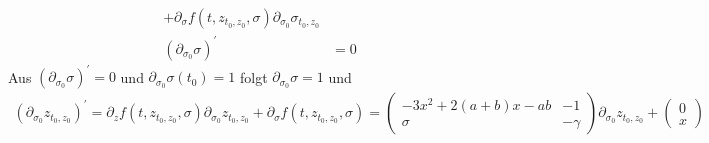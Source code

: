 \begin{solution}
\begin{enumerate}[label = \textbf{\alph*)}]
\begin{align*}
  + \partial_{\sigma} f(t,z_{t_0,z_0},\sigma) \partial_{\sigma_0} \sigma_{t_0,z_0} \\
  (\partial_{\sigma_0} \sigma)^{\prime} &= 0
\end{align*}
Aus $(\partial_{\sigma_0} \sigma)^{\prime} = 0$ und $\partial_{\sigma_0}\sigma(t_0) = 1$
folgt $\partial_{\sigma_0} \sigma = 1$ und
\begin{align*}
  (\partial_{\sigma_0}z_{t_0,z_0})^{\prime} =
  \partial_z f(t,z_{t_0,z_0},\sigma)\partial_{\sigma_0} z_{t_0,z_0}
  + \partial_\sigma f(t,z_{t_0,z_0},\sigma)
  = \begin{pmatrix}
    -3x^2 + 2(a + b)x - ab & - 1 \\
    \sigma & - \gamma
  \end{pmatrix}
  \partial_{\sigma_0} z_{t_0,z_0}
  + \begin{pmatrix}
    0 \\ x
  \end{pmatrix}
\end{align*}
\end{enumerate}
\end{solution}
